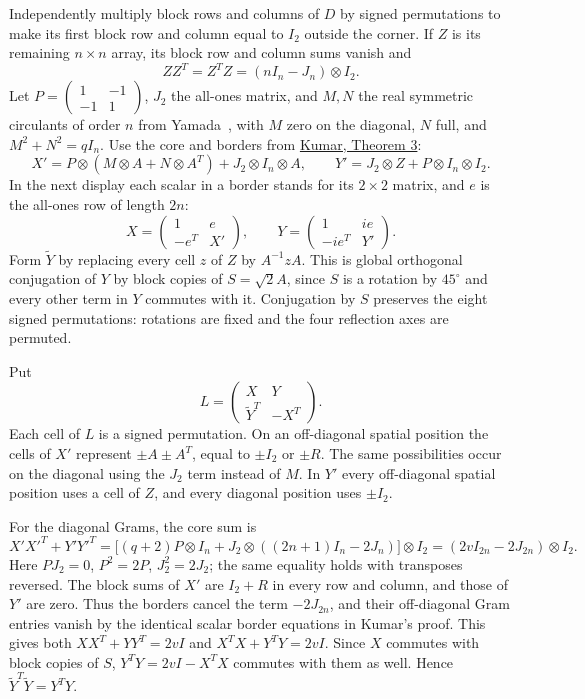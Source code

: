\documentclass[10pt]{article}
\begin{document}
Independently multiply block rows and columns of $D$ by signed permutations to make its first block row and column equal to $I_2$ outside the corner. If $Z$ is its remaining $n\times n$ array, its block row and column sums vanish and
\[
ZZ^T=Z^TZ=(nI_n-J_n)\otimes I_2 .
\]
Let $P=\left(\begin{smallmatrix}1&-1\\-1&1\end{smallmatrix}\right)$, $J_2$ the all-ones matrix, and $M,N$ the real symmetric circulants of order $n$ from Yamada~\cite{yamada}, with $M$ zero on the diagonal, $N$ full, and $M^2+N^2=qI_n$. Use the core and borders from \href{https://github.com/vatskishan03/Hadamard/blob/d885022144ba6bf4efa8315e14871a3736947527/complex-hadamard/CONFERENCE.md#3-the-template}{Kumar, Theorem 3}:
\[
 X'=P\otimes(M\otimes A+N\otimes A^T)
       +J_2\otimes I_n\otimes A,\qquad
 Y'=J_2\otimes Z+P\otimes I_n\otimes I_2 .
\]
In the next display each scalar in a border stands for its $2\times2$ matrix, and $e$ is the all-ones row of length $2n$:
\[
 X=\begin{pmatrix}1&e\\-e^T&X'\end{pmatrix},\qquad
 Y=\begin{pmatrix}1&i e\\-i e^T&Y'\end{pmatrix}.
\]
Form $\widetilde Y$ by replacing every cell $z$ of $Z$ by $A^{-1}zA$. This is global orthogonal conjugation of $Y$ by block copies of $S=\sqrt2 A$, since $S$ is a rotation by $45^\circ$ and every other term in $Y$ commutes with it. Conjugation by $S$ preserves the eight signed permutations: rotations are fixed and the four reflection axes are permuted.

Put
\[
 L=\begin{pmatrix}X&Y\\\widetilde Y^T&-X^T\end{pmatrix}.
\]
Each cell of $L$ is a signed permutation. On an off-diagonal spatial position the cells of $X'$ represent $\pm A\pm A^T$, equal to $\pm I_2$ or $\pm R$. The same possibilities occur on the diagonal using the $J_2$ term instead of $M$. In $Y'$ every off-diagonal spatial position uses a cell of $Z$, and every diagonal position uses $\pm I_2$.

For the diagonal Grams, the core sum is
\[
 X'X'^T+Y'Y'^T
   =\big[(q+2)P\otimes I_n+
           J_2\otimes((2n+1)I_n-2J_n)\big]\otimes I_2
   =(2vI_{2n}-2J_{2n})\otimes I_2.
\]
Here $PJ_2=0$, $P^2=2P$, $J_2^2=2J_2$; the same equality holds with transposes reversed. The block sums of $X'$ are $I_2+R$ in every row and column, and those of $Y'$ are zero. Thus the borders cancel the term $-2J_{2n}$, and their off-diagonal Gram entries vanish by the identical scalar border equations in Kumar's proof. This gives both $XX^T+YY^T=2vI$ and $X^TX+Y^TY=2vI$. Since $X$ commutes with block copies of $S$, $Y^TY=2vI-X^TX$ commutes with them as well. Hence $\widetilde Y^T\widetilde Y=Y^TY$.
\end{document}
